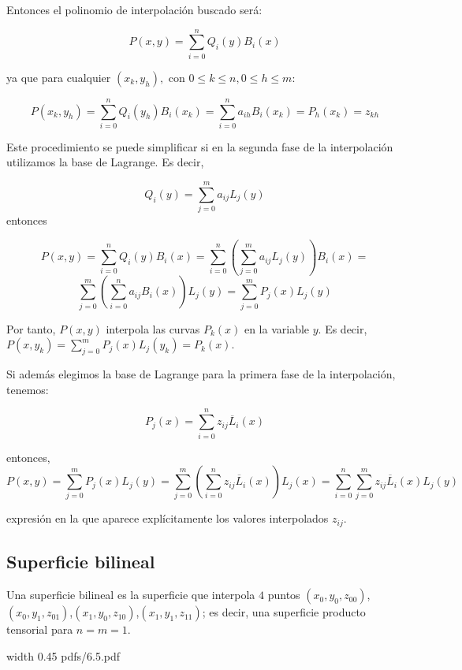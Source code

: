\documentclass[twoside]{report}
\newcommand{\colocapdf}[2]{\quad\pdfimage width #2 {pdfs/#1.pdf}}
\begin{document}
Entonces el polinomio de interpolaci\'{o}n buscado ser\'{a}:

$$P(x,y)=\sum_{i=0}^n Q_i(y) B_i(x)$$

ya que para cualquier $(x_k,y_h),$ con $0\leq k\leq n, 0\leq h\leq m$:

$$P(x_k,y_h)=\sum_{i=0}^n Q_i(y_h)B_i(x_k)=\sum_{i=0}^n a_{ih} B_i(x_k)=P_h(x_k)=z_{kh}$$

%

Este procedimiento se puede simplificar si en la segunda fase de la interpolaci\'{o}n utilizamos la base de Lagrange. Es decir,

$$Q_i(y)=\sum_{j=0}^m a_{ij} L_j(y)$$
entonces

$$P(x,y)=\sum_{i=0}^n Q_i(y) B_i(x)=\sum_{i=0}^n \left( \sum_{j=0}^m a_{ij} L_j(y)\right) B_i(x)=$$ $$\sum_{j=0}^m \left( \sum_{i=0}^n a_{ij} B_i(x)\right) L_j(y)= \sum_{j=0}^m P_j(x)L_j(y)$$

Por tanto, $P(x,y)$ interpola las curvas $P_k(x)$ en la variable $y$. Es decir, $P(x,y_k)=\sum_{j=0}^m P_j(x)L_j(y_k)= P_k(x)$.

Si adem\'{a}s elegimos la base de Lagrange para la primera fase de la interpolaci\'{o}n, tenemos:

$$P_j(x)=\sum_{i=0}^n z_{ij} \overline{L}_i(x)$$

entonces,
$$P(x,y)=\sum_{j=0}^m P_j(x) L_j(y)=\sum_{j=0}^m \left( \sum_{i=0}^n z_{ij} \overline{L}_i(x)\right) L_j(x)=\sum_{i=0}^n \sum_{j=0}^m z_{ij} \overline{L}_i(x) L_j(y)$$

expresi\'{o}n en la que aparece explícitamente los valores interpolados $z_{ij}$.

\subsection{Superficie bilineal}

\begin{defi}
Una superficie bilineal es la superficie que interpola $4$ puntos $(x_0,y_0,z_{00})$,\;$(x_0,y_1,z_{01})$,\;$(x_1,y_0,z_{10})$,\;$(x_1,y_1,z_{11})$; es decir, una superficie producto tensorial para $n=m=1$.
\end{defi}

\begin{center}
\colocapdf{6.5}{0.45\textwidth}
\end{center}
\end{document}
